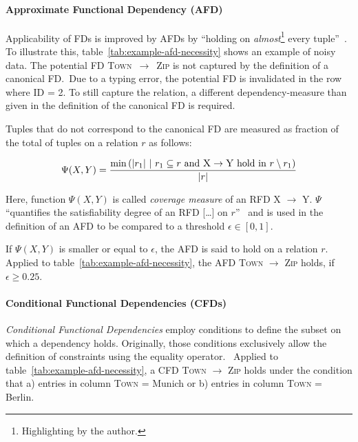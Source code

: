 \paragraph{Approximate Functional Dependency (AFD)}
Applicability of FDs is improved by AFDs by ``holding on \emph{almost}\footnote{Highlighting by the author.} every tuple''~\cite[p.~151]{CAR16}.
To illustrate this, table~\ref{tab:example-afd-necessity} shows an example of noisy data.
The potential FD \textsc{Town}~\(\to\)~\textsc{Zip} is not captured by the definition of a canonical FD.\
Due to a typing error, the potential FD is invalidated in the row where \textsc{ID = 2}.
To still capture the relation, a different dependency-measure than given in the definition of the canonical FD is required.

Tuples that do not correspond to the canonical FD are measured as fraction of the total of tuples on a relation \( r \) as follows:

\begin{align}
    \Psi(X, Y) = \frac{\min{\left(|r_1|~|~r_1 \subseteq r \text{ and } \textsc{X} \rightarrow \textsc{Y} \text{ hold in } r \setminus r_1 \right)}}{|r|}
\end{align}

Here, function \( \Psi(X, Y) \) is called \emph{coverage measure} of an RFD \textsc{X} \( \to \) \textsc{Y}.
\( \Psi \) ``quantifies the satisfiability degree of an RFD [\dots] on \( r \)''~\cite[p.~150]{CAR16} and is used in the definition of an AFD to be compared to a threshold \( \epsilon \in [0, 1] \).

If \( \Psi(X, Y) \) is smaller or equal to \( \epsilon \), the AFD is said to hold on a relation \( r \).
Applied to table~\ref{tab:example-afd-necessity}, the AFD \textsc{Town} \( \to \) \textsc{Zip} holds, if \( \epsilon \geq 0.25\).

\paragraph{Conditional Functional Dependencies (CFDs)}
\emph{Conditional Functional Dependencies} employ conditions to define the subset on which a dependency holds.
Originally, those conditions exclusively allow the definition of constraints using the equality operator.~\cite[p.~152]{CAR16}
Applied to table~\ref{tab:example-afd-necessity}, a CFD \textsc{Town} \( \to\) \textsc{Zip} holds under the condition that a) entries in column \textsc{Town} = Munich or b) entries in column \textsc{Town} = Berlin.

